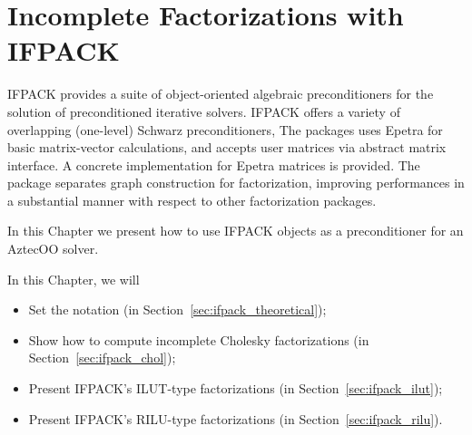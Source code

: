 % 
% 
% 
%   
%   
% 
% 

\chapter{Incomplete Factorizations with IFPACK}
\label{chap:ifpack}

IFPACK provides a suite of object-oriented algebraic preconditioners for
the solution of preconditioned iterative solvers. IFPACK offers a
variety of overlapping (one-level) Schwarz preconditioners, The packages
uses Epetra for basic matrix-vector calculations, and accepts user
matrices via abstract matrix interface. A concrete implementation for
Epetra matrices is provided. The package separates graph construction
for factorization, improving performances in a substantial manner with
respect to other factorization packages.

In this Chapter we present how to use IFPACK objects as a preconditioner
for an AztecOO solver. 

In this Chapter, we will
\begin{itemize}
\item Set the notation (in Section~\ref{sec:ifpack_theoretical});
\item Show how to compute incomplete Cholesky factorizations (in
  Section~\ref{sec:ifpack_chol});
\item Present IFPACK's ILUT-type factorizations (in
  Section~\ref{sec:ifpack_ilut});
\item Present IFPACK's RILU-type factorizations (in
  Section~\ref{sec:ifpack_rilu}).
\end{itemize}

